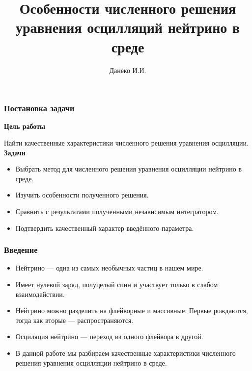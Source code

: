 \documentclass[utf8,9pt,mathserif,usepdftitle=false]{beamer}
\title{Особенности численного решения уравнения осцилляций нейтрино в среде}%
\author{Данеко И.И.}
\date[ИГУ, 2026]{%
  16 июня 2026\\%
  \vspace*{10ex}%
  \begin{flushright}
    \small
    Научный руководитель: Ломов В.П.\par
  \end{flushright}
  {\vspace*{7ex}
    \footnotesize%
    Иркутск, ФГБОУ ВО ИГУ\par%
  } }
\begin{document}
\begin{frame}
  \titlepage
\end{frame}


\begin{frame}
  \frametitle{Постановка задачи}%
  \textbf{Цель работы}

  Найти качественные характеристики численного решения уравнения
  осцилляции.\\[2ex]

  \textbf{Задачи}
  \begin{itemize}
    \item<3->
    Выбрать метод для численного решения уравнения осцилляции нейтрино в
    среде.

    \item<4->
    Изучить особенности полученного решения.

    \item<5->
    Сравнить с результатами полученными независимым интегратором.

    \item<6->
    Подтвердить качественный характер введённого параметра.
  \end{itemize}
\end{frame}


\begin{frame}
  \frametitle{Введение}%
  \begin{itemize}
  \item<1->
   Нейтрино — одна из самых необычных частиц в нашем мире.

   \item<2->
   Имеет нулевой заряд, полуцелый спин и участвует только в слабом
   взаимодействии.

  \item<3->
  Нейтрино можно разделить на флейворные и
  массивные. Первые рождаются, тогда как вторые — распространяются.

  \item<4->%
  Осциляция нейтрино --- переход из одного флейвора в другой.

  \item<5->%
   В данной работе мы разбираем качественные
  характеристики численного решения уравнения осцилляции нейтрино в среде.
  \end{itemize}
\end{frame}
\end{document}
